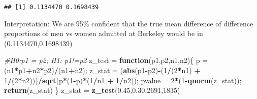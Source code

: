 \documentclass[]{article}
\newenvironment{Shaded}{\begin{snugshade}}{\end{snugshade}}
\newcommand{\KeywordTok}[1]{\textcolor[rgb]{0.13,0.29,0.53}{\textbf{#1}}}
\newcommand{\DecValTok}[1]{\textcolor[rgb]{0.00,0.00,0.81}{#1}}
\newcommand{\FloatTok}[1]{\textcolor[rgb]{0.00,0.00,0.81}{#1}}
\newcommand{\StringTok}[1]{\textcolor[rgb]{0.31,0.60,0.02}{#1}}
\newcommand{\CommentTok}[1]{\textcolor[rgb]{0.56,0.35,0.01}{\textit{#1}}}
\newcommand{\ControlFlowTok}[1]{\textcolor[rgb]{0.13,0.29,0.53}{\textbf{#1}}}
\newcommand{\OperatorTok}[1]{\textcolor[rgb]{0.81,0.36,0.00}{\textbf{#1}}}
\newcommand{\NormalTok}[1]{#1}
\begin{document}
\begin{Shaded}
\end{Shaded}

\begin{verbatim}
## [1] 0.1134470 0.1698439
\end{verbatim}

Interpretation: We are 95\% confident that the true mean difference of
difference proportions of men vs women admitted at Berkeley would be in
(0.1134470,0.1698439)

\begin{Shaded}
\begin{Highlighting}[]
\CommentTok{#H0:p1 = p2; H1: p1!=p2}
\NormalTok{z_test =}\StringTok{ }\ControlFlowTok{function}\NormalTok{(p1,p2,n1,n2)\{}
\NormalTok{  p =}\StringTok{ }\NormalTok{(n1}\OperatorTok{*}\NormalTok{p1}\OperatorTok{+}\NormalTok{n2}\OperatorTok{*}\NormalTok{p2)}\OperatorTok{/}\NormalTok{(n1}\OperatorTok{+}\NormalTok{n2);}
\NormalTok{  z_stat =}\StringTok{ }\NormalTok{(}\KeywordTok{abs}\NormalTok{(p1}\OperatorTok{-}\NormalTok{p2)}\OperatorTok{-}\NormalTok{(}\DecValTok{1}\OperatorTok{/}\NormalTok{(}\DecValTok{2}\OperatorTok{*}\NormalTok{n1) }\OperatorTok{+}\StringTok{ }\DecValTok{1}\OperatorTok{/}\NormalTok{(}\DecValTok{2}\OperatorTok{*}\NormalTok{n2)))}\OperatorTok{/}\KeywordTok{sqrt}\NormalTok{(p}\OperatorTok{*}\NormalTok{(}\DecValTok{1}\OperatorTok{-}\NormalTok{p)}\OperatorTok{*}\NormalTok{(}\DecValTok{1}\OperatorTok{/}\NormalTok{n1 }\OperatorTok{+}\StringTok{ }\DecValTok{1}\OperatorTok{/}\NormalTok{n2));}
\NormalTok{  pvalue =}\StringTok{ }\DecValTok{2}\OperatorTok{*}\NormalTok{(}\DecValTok{1}\OperatorTok{-}\KeywordTok{qnorm}\NormalTok{(z_stat));}
  \KeywordTok{return}\NormalTok{(z_stat)}
\NormalTok{\}}
\NormalTok{ z_stat =}\StringTok{ }\KeywordTok{z_test}\NormalTok{(}\FloatTok{0.45}\NormalTok{,}\FloatTok{0.30}\NormalTok{,}\DecValTok{2691}\NormalTok{,}\DecValTok{1835}\NormalTok{)}
\end{Highlighting}
\end{Shaded}
\end{document}
